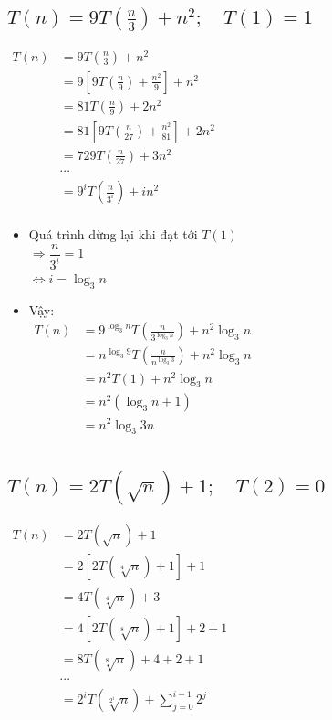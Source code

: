 \documentclass[12pt, letterpaper]{article}
\begin{document}
\subsection{$ T(n) = 9T(\frac{n}{3}) + n^2; \quad T(1) = 1 $}
$ \begin{aligned}
    T(n) &= 9T(\frac{n}{3}) + n^2 \\
        &= 9[9T(\frac{n}{9}) + \frac{n^2}{9}] + n^2 \\
        &= 81T(\frac{n}{9}) + 2n^2 \\
        &= 81[9T(\frac{n}{27}) + \frac{n^2}{81}] + 2n^2 \\
        &= 729 T(\frac{n}{27}) + 3n^2 \\
        &\cdots \\
        &= 9^i T(\frac{n}{3^i}) + in^2 \\
\end{aligned} $

\begin{itemize}[label=-]
    \item Quá trình dừng lại khi đạt tới $ T(1) $ \\
        $ \Rightarrow \dfrac{n}{3^i} = 1 $ \\
        $ \Leftrightarrow i = \log_3n $
    \item Vậy:\\
        $ \begin{aligned}
            T(n) &= 9^{\log_3n} T(\frac{n}{3^{\log_3n}}) + n^2{\log_3n} \\
                &= n^{\log_3 9} T(\frac{n}{n^{\log_3 3}}) + n^2{\log_3n} \\
                &= n^2 T(1) + n^2{\log_3n} \\
                &= n^2 (\log_3 n + 1) \\
                &= n^2 \log_3 3n \\
        \end{aligned} $
\end{itemize}

\subsection{$ T(n) = 2T(\sqrt{n}) + 1; \quad T(2) = 0 $}
$ \begin{aligned}
    T(n) &= 2T(\sqrt{n}) + 1 \\
        &= 2[2T(\sqrt[4]{n}) + 1] + 1 \\
        &= 4T(\sqrt[4]{n}) + 3 \\
        &= 4[2T(\sqrt[8]{n}) + 1] + 2 + 1 \\
        &= 8T(\sqrt[8]{n}) + 4 + 2 + 1 \\
        &\cdots \\
        &= 2^{i}T(\sqrt[2^i]{n}) + \sum_{j = 0}^{i - 1}2^j \\
\end{aligned} $
\end{document}
